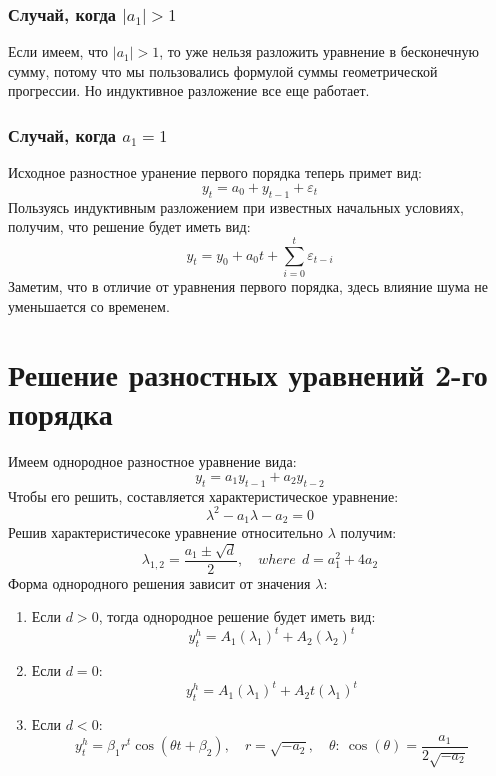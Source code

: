 \documentclass[]{article}
\begin{document}
\subsubsection*{Случай, когда $ |a_1| >1 $}
Если имеем, что $ |a_1| > 1 $, то уже нельзя разложить уравнение в бесконечную сумму, потому что мы пользовались формулой суммы геометрической прогрессии. Но индуктивное разложение все еще работает.
\subsubsection*{Случай, когда $ a_1 =1 $}
Исходное разностное уранение первого порядка теперь примет вид:
\[
	y_t = a_0 + y_{t-1} + \varepsilon_t
\]
Пользуясь индуктивным разложением при известных начальных условиях, получим, что решение будет иметь вид:
\[
	y_t = y_0 + a_0t + \sum_{i=0}^{t}\varepsilon_{t-i}
\]
Заметим, что в отличие от уравнения первого порядка, здесь влияние шума не уменьшается со временем.
\section*{Решение разностных уравнений 2-го порядка}
Имеем однородное разностное уравнение вида:
\begin{equation}\label{второй порядок}
	y_t = a_1y_{t-1} + a_2y_{t-2}
\end{equation}
Чтобы его решить, составляется характеристическое уравнение:
\[
	\lambda^2 - a_1\lambda - a_2 = 0
\]
Решив характеристичесоке уравнение относительно $ \lambda  $ получим:
\[
	\lambda_{1,2} = \frac{a_1 \pm \sqrt{d}}{2}, \quad where ~~d = a_1^2 +4a_2
\]
Форма однородного решения зависит от значения $ \lambda $:
\begin{enumerate}
	\item Если $ d > 0 $, тогда однородное решение будет иметь вид: 
	\[
		y^{h}_{t} = A_1(\lambda_{1})^t + A_2 (\lambda_{2})^t
	\]
	\item Если $ d = 0 $:
	\[ 	y^{h}_{t} =  A_1(\lambda_{1})^t + A_2t (\lambda_{1})^t	\]
	\item Если $ d < 0 $:
	\[
		y^{h}_{t} = \beta_1r^{t}\cos(\theta t + \beta_2), \quad r = \sqrt{-a_2}, \quad\theta{:} ~ \cos(\theta) = \frac{a_1}{2\sqrt{-a_2}}
	\]
\end{enumerate}
\end{document}
